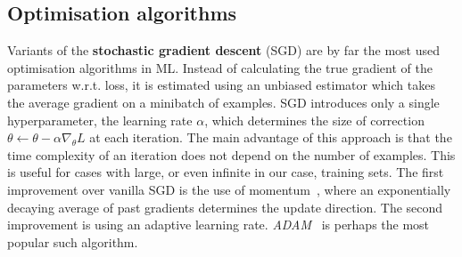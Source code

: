 \subsection{Optimisation algorithms}
Variants of the \textbf{stochastic gradient descent} (SGD) are by far the most used optimisation algorithms in ML. Instead of calculating the true gradient of the parameters w.r.t. loss, it is estimated using an unbiased estimator which takes the average gradient on a minibatch of examples. SGD introduces only a single hyperparameter, the learning rate $\alpha$, which determines the size of correction $\theta \leftarrow \theta - \alpha \nabla_\theta L$ at each iteration. The main advantage of this approach is that the time complexity of an iteration does not depend on the number of examples. This is useful for cases with large, or even infinite in our case, training sets. The first improvement over vanilla SGD is the use of momentum~\cite{polyak1964some}, where an exponentially decaying average of past gradients determines the update direction. The second improvement is using an adaptive learning rate. \emph{ADAM}~\cite{kingma2014adam} is perhaps the most popular such algorithm. 

